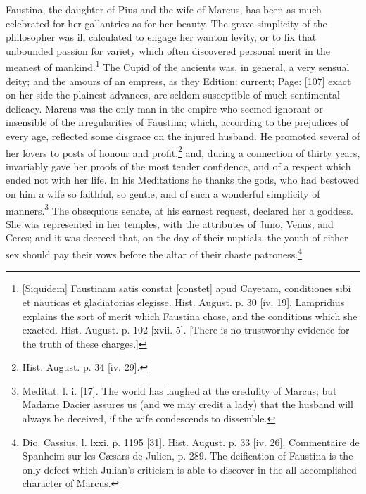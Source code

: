 Faustina, the daughter of Pius and the wife of Marcus, has been as much celebrated for her gallantries as for her beauty. The grave simplicity of the philosopher was ill calculated to engage her wanton levity, or to fix that unbounded passion for variety which often discovered personal merit in the meanest of mankind.\footnote{[Siquidem] Faustinam satis constat [constet] apud Cayetam, conditiones sibi et nauticas et gladiatorias elegisse. Hist. August. p. 30 [iv. 19]. Lampridius explains the sort of merit which Faustina chose, and the conditions which she exacted. Hist. August. p. 102 [xvii. 5]. [There is no trustworthy evidence for the truth of these charges.]} The Cupid of the ancients was, in general, a very sensual deity; and the amours of an empress, as they Edition: current; Page: [107] exact on her side the plainest advances, are seldom susceptible of much sentimental delicacy. Marcus was the only man in the empire who seemed ignorant or insensible of the irregularities of Faustina; which, according to the prejudices of every age, reflected some disgrace on the injured husband. He promoted several of her lovers to posts of honour and profit,\footnote{Hist. August. p. 34 [iv. 29].} and, during a connection of thirty years, invariably gave her proofs of the most tender confidence, and of a respect which ended not with her life. In his Meditations he thanks the gods, who had bestowed on him a wife so faithful, so gentle, and of such a wonderful simplicity of manners.\footnote{Meditat. l. i. [17]. The world has laughed at the credulity of Marcus; but Madame Dacier assures us (and we may credit a lady) that the husband will always be deceived, if the wife condescends to dissemble.} The obsequious senate, at his earnest request, declared her a goddess. She was represented in her temples, with the attributes of Juno, Venus, and Ceres; and it was decreed that, on the day of their nuptials, the youth of either sex should pay their vows before the altar of their chaste patroness.\footnote{Dio. Cassius, l. lxxi. p. 1195 [31]. Hist. August. p. 33 [iv. 26]. Commentaire de Spanheim sur les Cæsars de Julien, p. 289. The deification of Faustina is the only defect which Julian\texthebrew{}’s criticism is able to discover in the all-accomplished character of Marcus.}


